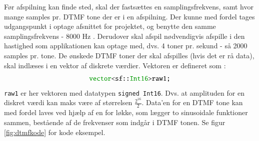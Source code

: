 Før afspilning kan finde sted, skal der fastsættes en samplingsfrekvens, samt hvor mange samples pr. DTMF tone der er i en afspilning. Der kunne med fordel tages udgangspunkt i optage afsnittet for projektet, og benytte den samme samplingsfrekvens - 8000 Hz . Derudover skal afspil nødvendigvis afspille i den hastighed som applikationen kan optage med, dvs. 4 toner pr. sekund - så 2000 samples pr. tone.
\newline
De ønskede DTMF toner der skal afspilles (hvis det er rå data), skal indlæses i en vektor af diskrete værdier. Vektoren er defineret som :
$$\texttt{\textcolor{dkgreen}{vector}<sf::\textcolor{dkgreen}{Int16}>raw1;}$$
\newline
\texttt{raw1} er her vektoren med datatypen \texttt{signed \textcolor{dkgreen}{Int16}}. Dvs. at amplituden for en diskret værdi kan maks være af størrelsen $\frac{2^16}{2}$. Data’en for en DTMF tone kan med fordel laves ved hjælp af en for løkke, som lægger to sinusoidale funktioner sammen, bestående af de frekvenser som indgår i DTMF tonen. Se figur \ref{fig:dtmfkode} for kode eksempel.
